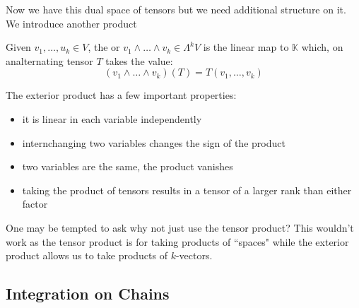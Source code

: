Now we have this dual space of tensors but we need additional structure on it. We
introduce another product

\begin{definition}
    Given $v_1,\hdots,u_k \in V$, the  or 
    $v_1 \wedge \hdots \wedge v_k \in \Lambda^k V$ is the linear map to $\mathbb{K}$
    which, on analternating tensor $T$ takes the value:
    \begin{equation*}
        (v_1 \wedge \hdots \wedge v_k)(T) = T(v_1,\hdots,v_k)
    \end{equation*}
\end{definition}

The exterior product has a few important properties:
\begin{itemize}
    \item it is linear in each variable independently
    \item internchanging two variables changes the sign of the product
    \item two variables are the same, the product vanishes
    \item taking the product of tensors results in a tensor of a larger rank than
    either factor
\end{itemize}


One may be tempted to ask why not just use the tensor product? This wouldn't work
as the tensor product is for taking products of ``spaces" while the exterior
product allows us to take products of $k$-vectors.

\subsection{Integration on Chains}